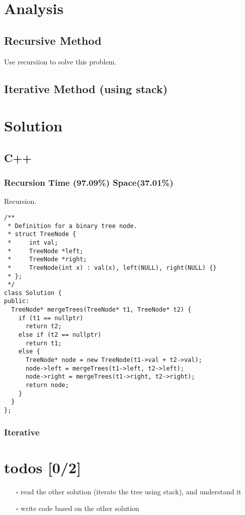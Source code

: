 \documentclass[12pt]{book}
\begin{document}
\section{Analysis}
\label{sec:orgc850ce8}
\subsection{Recursive Method}
\label{sec:org2438f62}
Use recursiion to solve this problem.
\subsection{Iterative Method (using stack)}
\label{sec:orga72f886}

\section{Solution}
\label{sec:org20e372c}
\subsection{C++}
\label{sec:org4892f6f}
\subsubsection{Recursion Time (97.09\%) Space(37.01\%)}
\label{sec:org2093c0b}
Recursion.
\begin{verbatim}
/**
 * Definition for a binary tree node.
 * struct TreeNode {
 *     int val;
 *     TreeNode *left;
 *     TreeNode *right;
 *     TreeNode(int x) : val(x), left(NULL), right(NULL) {}
 * };
 */
class Solution {
public:
  TreeNode* mergeTrees(TreeNode* t1, TreeNode* t2) {
    if (t1 == nullptr)
      return t2;
    else if (t2 == nullptr)
      return t1;
    else {
      TreeNode* node = new TreeNode(t1->val + t2->val);
      node->left = mergeTrees(t1->left, t2->left);
      node->right = mergeTrees(t1->right, t2->right);
      return node;
    }
  }
};
\end{verbatim}
\subsubsection{Iterative}
\label{sec:org0e0e8e8}
\section{todos [0/2]}
\label{sec:org7c7ce1a}
\begin{itemize}
\item[{$\square$}] read the other solution (iterate the tree using stack), and understand it
\item[{$\square$}] write code based on the other solution
\end{itemize}
\end{document}
